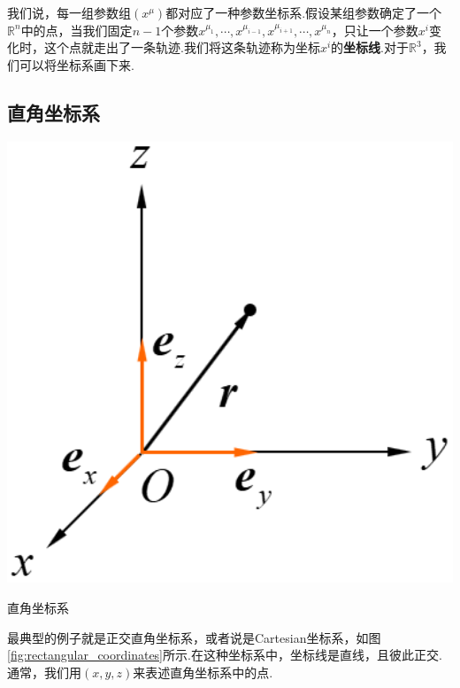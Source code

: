 	我们说，每一组参数组$(x^\mu)$都对应了一种参数坐标系.假设某组参数确定了一个$\mathbb{R}^n$中的点，当我们固定$n-1$个参数$x^{\mu_1},\cdots,x^{\mu_{i-1}},x^{\mu_{i+1}},\cdots,x^{\mu_n}$，只让一个参数$x^i$变化时，这个点就走出了一条轨迹.我们将这条轨迹称为坐标$x^i$的\textbf{坐标线}.对于$\mathbb{R}^3$，我们可以将坐标系画下来.
	\subsection{直角坐标系}
		\begin{marginfigure}
			\centering
			\includegraphics[width=1\textwidth]{figures/rectangular_coordinates.png}
			\caption{直角坐标系}\label{fig:rectangular_coordinates}
		\end{marginfigure}
	最典型的例子就是正交直角坐标系，或者说是Cartesian坐标系，如图\ref{fig:rectangular_coordinates}所示.在这种坐标系中，坐标线是直线，且彼此正交.通常，我们用$(x,y,z)$来表述直角坐标系中的点.
